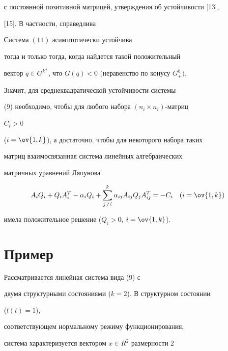 с постоянной позитивной матрицей, утверждения об устойчивости [13], 


[15]. В частности, справедлива 


 


\begin{thm} 


Система $(11)$ асимптотически устойчива 


тогда и только тогда, когда найдется такой положительный  


вектор $q\in G^{k^+}$, что $G(q)<0$ $($неравенство по конусу $G^k_+)$. 


\end{thm} 


 


Значит, для среднеквадратической устойчивости системы 


(9) необходимо, чтобы для любого набора $(n_i\times n_i)$-матриц 


$C_i>0$ 


($i=\ov{1,k}$), а достаточно, чтобы для некоторого набора таких  


матриц взаимосвязанная система линейных алгебраических  


матричных уравнений Ляпунова 


\begin{equation} 


A_i Q_i+Q_i A^T_i-\alpha_i Q_i+\sum^k_{j\ne i}\alpha_{ij} 


A_{ij}Q_j A^T_{ij}=-C_i\quad (i=\ov{1,k}) 


\end{equation} 


имела положительное решение ($Q_i>0$, $i=\ov{1,k}$). 


 


\section{Пример} 


 


Рассматривается линейная система вида (9) с 


двумя структурными состояниями ($k=2$). В структурном состоянии 


($l(t)=1$), 


соответствующем нормальному режиму функционирования, 


система характеризуется вектором $x\in R^2$ размерности 2 


